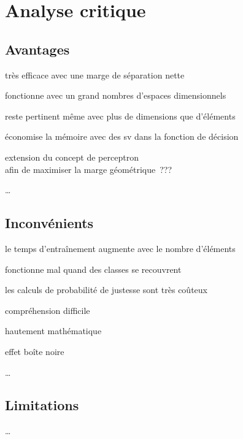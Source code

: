 \section{Analyse critique}

\subsection{Avantages}

\begin{itmz}
\item{très efficace avec une marge de séparation nette}
\item{fonctionne avec un grand nombres d’espaces dimensionnels}
\item{reste pertinent même avec plus de dimensions que d’éléments}
\item{économise la mémoire avec des \gls{sv} dans la fonction de décision}

\item{extension du concept de perceptron\\
afin de maximiser la marge géométrique ???}
\end{itmz}

…

\subsection{Inconvénients}

\begin{itmz}
\item{le temps d’entraînement augmente avec le nombre d’éléments}
\item{fonctionne mal quand des classes se recouvrent}
\item{les calculs de probabilité de justesse sont très coûteux}

\item{compréhension difficile}
\item{hautement mathématique}
\item{effet boîte noire}
\end{itmz}

…

\subsection{Limitations}

…

\pagebreak
